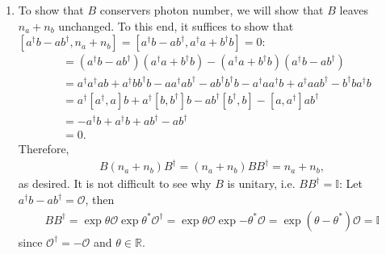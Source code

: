 \documentclass{article}
\theoremstyle{definition}
\begin{document}
\begin{enumerate}[label=\alph*)]

\item To show that $B$ conservers photon number, we will show that $B$ leaves $n_a + n_b$ unchanged. To this end, it suffices to show that $[a^\dagger b - a b^\dagger , n_a + n_b] = [a^\dagger b - ab^\dagger, a^\dagger a + b^\dagger b] = 0$:
\begin{align*}
[a^\dagger b - ab^\dagger, a^\dagger a + b^\dagger b]
&= (a^\dagger b - ab^\dagger)(a^\dagger a + b^\dagger b) - (a^\dagger a + b^\dagger b)(a^\dagger b - ab^\dagger) \\
&= a^\dagger a^\dagger ab + a^\dagger bb^\dagger b - aa^\dagger ab^\dagger -ab^\dagger b^\dagger b - a^\dagger a a^\dagger b + a^\dagger a a b^\dagger - b^\dagger b a^\dagger b \\
&= a^\dagger [a^\dagger , a] b + a^\dagger [b,b^\dagger] b - ab^\dagger [b^\dagger ,b] - [a,a^\dagger] ab^\dagger  \\
&= -a^\dagger b + a^\dagger b + ab^\dagger -ab^\dagger \\
&= 0.
\end{align*}
Therefore,
\begin{align*}
B (n_a+n_b) B^\dagger = (n_a + n_b) BB^\dagger = n_a + n_b,
\end{align*}
as desired. It is not difficult to see why $B$ is unitary, i.e. $B B^\dagger = \mathbb{I}$: Let $a^\dagger b -ab^\dagger = \mathcal{O}$, then 
\begin{align*}
BB^\dagger = \exp{\theta \mathcal{O}}\exp{\theta^*\mathcal{O}^\dagger} =  \exp{\theta \mathcal{O}}\exp{-\theta^*\mathcal{O}} = \exp{(\theta - \theta^*)\mathcal{O}} = \mathbb{I}
\end{align*}
since $\mathcal{O}^\dagger = -\mathcal{O}$ and $\theta \in \mathbb{R}$.




\end{enumerate}
\end{document}
